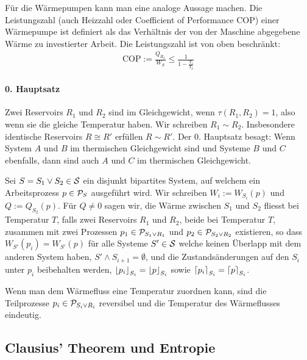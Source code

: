 \begin{definition}[Leistungszahl]
    Für die Wärmepumpen kann man eine analoge Aussage machen. Die Leistungszahl
    (auch Heizzahl oder Coefficient of Performance COP) einer Wärmepumpe ist
    definiert als das Verhältnis der von der Maschine abgegebene Wärme zu
    investierter Arbeit. Die Leistungszahl ist von oben beschränkt:
    \begin{align*}
        \text{COP} := \frac{Q_{R_2}}{W_S} \leq \frac{1}{1 - \frac{T_1}{T_2}}
    \end{align*}
\end{definition}

\paragraph{0. Hauptsatz}
Zwei Reservoirs $R_1$ und $R_2$ sind im Gleichgewicht, wenn $\tau(R_1,R_2)
= 1$, also wenn sie die gleiche Temperatur haben. Wir schreiben $R_1 \sim R_2$.
Insbesondere identische Reservoirs $R \cong R'$ erfüllen $R \sim R'$. Der
0. Hauptsatz besagt: Wenn System $A$ und $B$ im thermischen Gleichgewicht
sind und Systeme $B$ und $C$ ebenfalls, dann sind auch $A$ und $C$ im
thermischen Gleichgewicht.

\begin{definition}
    Sei $S = S_1 \vee S_2 \in \S$ ein disjunkt bipartites System, auf welchem
    ein Arbeitsprozess $p \in \P_S$ ausgeführt wird. Wir schreiben $W_i :=
    W_{S_i}(p)$ und $Q := Q_{S_2}(p)$. Für $Q \neq 0$ sagen wir, die Wärme
    zwischen $S_1$ und $S_2$ fliesst bei Temperatur $T$, falls zwei Reservoirs
    $R_1$ und $R_2$, beide bei Temperatur $T$, zusammen mit zwei Prozessen
    $p_1 \in \P_{S_1 \vee R_1}$ und $p_2 \in \P_{S_2 \vee R_2}$ existieren,
    so dass $W_{S'}(p_i) = W_{S'}(p)$ für alle Systeme $S' \in \S$ welche
    keinen Überlapp mit dem anderen System haben, $S' \wedge S_{i+1} = \emptyset$,
    und die Zustandsänderungen auf den $S_i$ unter $p_i$ beibehalten werden,
    $\floor{p_i}_{S_i} = \floor{p}_{S_i}$ sowie $\ceil{p_i}_{S_i} = \ceil{p}_{S_i}$.
\end{definition}

\begin{lemma}
    Wenn man dem Wärmefluss eine Temperatur zuordnen kann, sind die
    Teilprozesse $p_i \in \P_{S_i \vee R_i}$ reversibel und die Temperatur
    des Wärmeflusses eindeutig.
\end{lemma}


\subsection{Clausius' Theorem und Entropie}

